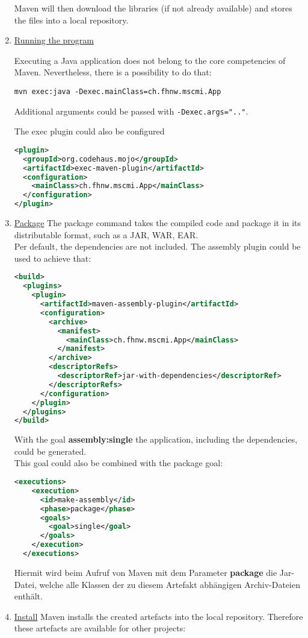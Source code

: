 \begin{enumerate}
Maven will then download the libraries (if not already available) and
stores the files into a local repository.
%
\newslide
\item \underline{Running the program}

Executing a Java application does not belong to the core competencies
of Maven. Nevertheless, there is a possibility to do that:

\begin{lstlisting}
mvn exec:java -Dexec.mainClass=ch.fhnw.mscmi.App
\end{lstlisting}
Additional arguments could be passed with \verb+-Dexec.args=".."+.

The exec plugin could also be configured
\begin{lstlisting}[language=xml,
  morekeywords={plugin,groupId,artifactId,configuration,mainClass}]
<plugin>
  <groupId>org.codehaus.mojo</groupId>
  <artifactId>exec-maven-plugin</artifactId>
  <configuration>
    <mainClass>ch.fhnw.mscmi.App</mainClass>
  </configuration>
</plugin>
\end{lstlisting}
\newslide

\item \underline{Package}
The package command takes the compiled code and package it in its
distributable format, such as a JAR, WAR, EAR.\\
Per default, the dependencies are not included. The assembly plugin could be
used to achieve that:

\begin{lstlisting}[language=xml,
  morekeywords={build,plugins,plugin,artifactId,configuration,descriptorRefs,
  descriptorRef}]
<build>
  <plugins>
    <plugin>
      <artifactId>maven-assembly-plugin</artifactId>
      <configuration>
        <archive>
          <manifest>
            <mainClass>ch.fhnw.mscmi.App</mainClass>
          </manifest>
        </archive>
        <descriptorRefs>
          <descriptorRef>jar-with-dependencies</descriptorRef>
        </descriptorRefs>
      </configuration>
    </plugin>
  </plugins>
</build>
\end{lstlisting}

With the goal {\bfseries assembly:single} the application,
including the dependencies, could be generated.\\
This goal could also be combined with the package goal:

\begin{lstlisting}[language=xml,
  morekeywords={executions,execution,id,phase,goals,goal}]
  <executions>
    <execution>
      <id>make-assembly</id>
      <phase>package</phase>
      <goals>
        <goal>single</goal>
      </goals>
    </execution>
  </executions>
\end{lstlisting}
Hiermit wird beim Aufruf von Maven mit dem Parameter {\bfseries package} die
Jar-Datei, welche alle Klassen der zu diesem Artefakt abhängigen
Archiv-Dateien enthält.
%
\newslide
\item \underline{Install}
Maven installs the created artefacts into the local repository. Therefore
these artefacts are available for other projects:


\end{enumerate}
